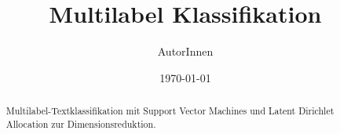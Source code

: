 \documentclass{scrartcl}
\title{Multilabel Klassifikation}
\author{AutorInnen}
\date{\today}
\begin{document}
\maketitle

\begin{abstract}
    Multilabel-Textklassifikation mit Support Vector Machines und Latent Dirichlet Allocation zur Dimensionsreduktion.
\end{abstract}

\tableofcontents
\newpage









\nocite{*}
\newpage


\end{document}
